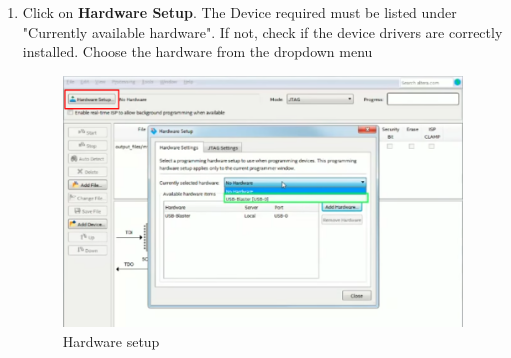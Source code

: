 \documentclass[12pt,singleside,a4paper]{article}
\begin{document}
\begin{enumerate}
     \item Click on \textbf{Hardware Setup}. The Device required must be listed under "Currently available hardware". If not, check if the device drivers are correctly installed. Choose the hardware from the dropdown menu
     \begin{figure}[H]
         \centering
         \includegraphics[width=14cm,keepaspectratio]{3.png}
     \caption{Hardware setup}
     \end{figure}
     

\end{enumerate}
\end{document}
